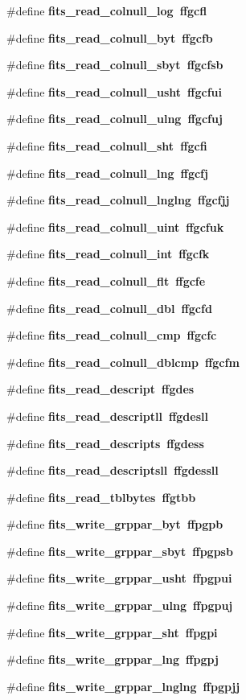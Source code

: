 \begin{CompactItemize}
\item 
\#define \bf{fits\_\-read\_\-colnull\_\-log}~ffgcfl
\item 
\#define \bf{fits\_\-read\_\-colnull\_\-byt}~ffgcfb
\item 
\#define \bf{fits\_\-read\_\-colnull\_\-sbyt}~ffgcfsb
\item 
\#define \bf{fits\_\-read\_\-colnull\_\-usht}~ffgcfui
\item 
\#define \bf{fits\_\-read\_\-colnull\_\-ulng}~ffgcfuj
\item 
\#define \bf{fits\_\-read\_\-colnull\_\-sht}~ffgcfi
\item 
\#define \bf{fits\_\-read\_\-colnull\_\-lng}~ffgcfj
\item 
\#define \bf{fits\_\-read\_\-colnull\_\-lnglng}~ffgcfjj
\item 
\#define \bf{fits\_\-read\_\-colnull\_\-uint}~ffgcfuk
\item 
\#define \bf{fits\_\-read\_\-colnull\_\-int}~ffgcfk
\item 
\#define \bf{fits\_\-read\_\-colnull\_\-flt}~ffgcfe
\item 
\#define \bf{fits\_\-read\_\-colnull\_\-dbl}~ffgcfd
\item 
\#define \bf{fits\_\-read\_\-colnull\_\-cmp}~ffgcfc
\item 
\#define \bf{fits\_\-read\_\-colnull\_\-dblcmp}~ffgcfm
\item 
\#define \bf{fits\_\-read\_\-descript}~ffgdes
\item 
\#define \bf{fits\_\-read\_\-descriptll}~ffgdesll
\item 
\#define \bf{fits\_\-read\_\-descripts}~ffgdess
\item 
\#define \bf{fits\_\-read\_\-descriptsll}~ffgdessll
\item 
\#define \bf{fits\_\-read\_\-tblbytes}~ffgtbb
\item 
\#define \bf{fits\_\-write\_\-grppar\_\-byt}~ffpgpb
\item 
\#define \bf{fits\_\-write\_\-grppar\_\-sbyt}~ffpgpsb
\item 
\#define \bf{fits\_\-write\_\-grppar\_\-usht}~ffpgpui
\item 
\#define \bf{fits\_\-write\_\-grppar\_\-ulng}~ffpgpuj
\item 
\#define \bf{fits\_\-write\_\-grppar\_\-sht}~ffpgpi
\item 
\#define \bf{fits\_\-write\_\-grppar\_\-lng}~ffpgpj
\item 
\#define \bf{fits\_\-write\_\-grppar\_\-lnglng}~ffpgpjj
\item 

\end{CompactItemize}
